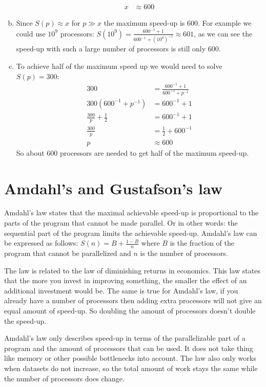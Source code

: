 \documentclass[a4paper]{article}
\begin{document}
\begin{enumerate}[(a)]
\begin{align*}
			x &\approx 600
		\end{align*}
	\item Since $S(p) \approx x$ for $p \gg x$ the maximum speed-up is 600. For example we could use $10^9$ processors: $\displaystyle S(10^9) = \frac{600^{-1} + 1}{600^{-1} + (10^9)^{-1}} \approx 601$, as we can see the speed-up with such a large number of processors is still only 600.
	\item To achieve half of the maximum speed up we would need to solve $S(p) = 300$:
		\begin{align*}
			300 &= \frac{600^{-1} + 1}{600^{-1} + p^{-1}} \\
			300 (600^{-1} + p^{-1}) &= 600^{-1} + 1 \\
			\frac{300}{p} + \frac{1}{2} &= 600^{-1} + 1 \\
			\frac{300}{p} &= \frac{1}{2} + 600^{-1} \\
			p &\approx 600
		\end{align*}
		So about 600 processors are needed to get half of the maximum speed-up.
\end{enumerate}

\section{Amdahl's and Gustafson's law}
Amdahl's law states that the maximal achievable speed-up is proportional to the parts of the program that cannot be made parallel. Or in other words: the sequential part of the program limits the achievable speed-up. Amdahl's law can be expressed as follows: $S(n) = B + \frac{1 - B}{n}$ where $B$ is the fraction of the program that cannot be parallelized and $n$ is the number of processors.

The law is related to the law of diminishing returns in economics. This law states that the more you invest in improving something, the smaller the effect of an additional investment would be. The same is true for Amdahl's law, if you already have a number of processors then adding extra processors will not give an equal amount of speed-up. So doubling the amount of processors doesn't double the speed-up.

Amdahl's law only describes speed-up in terms of the parallelizable part of a program and the amount of processors that can be used. It does not take thing like memory or other possible bottlenecks into account. The law also only works when datasets do not increase, so the total amount of work stays the same while the number of processors does change.
\end{document}
